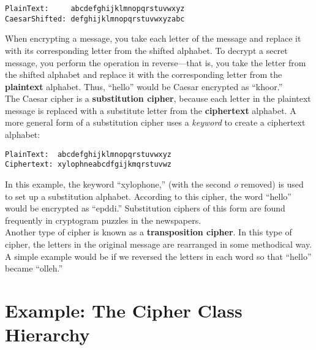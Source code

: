 \begin{jjjlisting}
\begin{lstlisting}
PlainText:     abcdefghijklmnopqrstuvwxyz
CaesarShifted: defghijklmnopqrstuvwxyzabc
\end{lstlisting}
\end{jjjlisting}

\noindent When encrypting a message, you take each letter
of the message and replace it with its corresponding letter from the
shifted alphabet.  To decrypt a secret message, you perform the
operation in reverse---that is, you take the letter from the shifted
alphabet and replace it with the corresponding letter from the
{\bf plaintext} alphabet.  Thus, ``hello'' would be
Caesar encrypted as ``khoor.''\\
\hspace*{1pc}The Caesar cipher is a {\bf substitution cipher},
because each letter in the plaintext message is replaced with
a substitute letter from the {\bf ciphertext}
alphabet. A more general form of a
substitution cipher uses a {\it keyword} to
create a ciphertext alphabet:

\begin{jjjlisting}
\begin{lstlisting}
PlainText:  abcdefghijklmnopqrstuvwxyz
Ciphertext: xylophneabcdfgijkmqrstuvwz
\end{lstlisting}
\end{jjjlisting}

\noindent In this example, the keyword ``xylophone,''
(with the second {\it o} removed) is used to set up a substitution
alphabet.  According to this cipher, the word ``hello'' would be encrypted
as ``epddi.''  Substitution ciphers of this form are found frequently in
cryptogram puzzles in the newspapers.\\
\hspace*{1pc}Another type of cipher is known as a {\bf transposition
cipher}. In this type of cipher, the
letters in the original message are rearranged in some methodical way.
A simple example would be if we reversed the letters in each word so
that ``hello'' became ``olleh.'' 

\section{Example: The Cipher Class Hierarchy}
\label{example-the-cipher-class-hierarchy}

